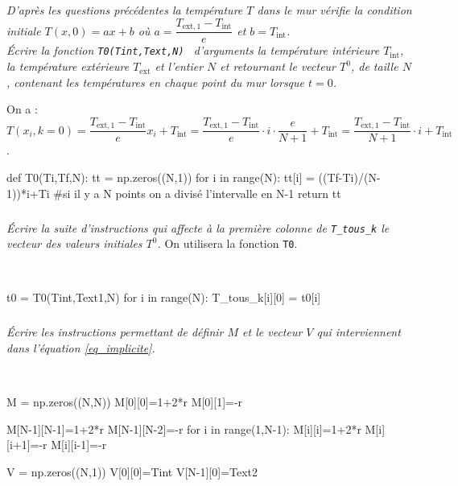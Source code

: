 \documentclass[10pt,fleqn]{article} %
\begin{document}
\subparagraph{}
\textit{D'après les questions précédentes la température $T$ dans le mur vérifie la condition
 initiale  $T(x,0)=ax+b$ où 
 $a=\dfrac{T_{\text{ext},1}-T_{\text{int}}}{e}$  et  $b=T_{\text{int}}$.\\
Écrire la fonction \texttt{T0(Tint,Text,N) } d'arguments la température intérieure $T_{\text{int}}$, 
la température extérieure $T_{\text{ext}}$ et l'entier $N$ et retournant le vecteur $T^0$, de taille $N$,
contenant les températures en chaque point du mur lorsque $t=0$. }
\ifprof
\begin{corrige} 
On a : $T(x_i,k=0)=\dfrac{T_{\text{ext},1}-T_{\text{int}}}{e}x_i + T_{\text{int}} = \dfrac{T_{\text{ext},1}-T_{\text{int}}}{e}\cdot i \cdot \dfrac{e}{N+1} + T_{\text{int}} =  \dfrac{T_{\text{ext},1}-T_{\text{int}}}{N+1}\cdot i  + T_{\text{int}}$.
~\\
\begin{python}
def T0(Ti,Tf,N):
    tt =  np.zeros((N,1))
    for i in range(N):
        tt[i] = ((Tf-Ti)/(N-1))*i+Ti #si il y a N points on a divisé l'intervalle en N-1
    return tt
\end{python}
\end{corrige}
\else
\fi



\subparagraph{}
\textit{Écrire la suite d'instructions qui affecte à la première colonne de \texttt{T\_tous\_k} 
 le vecteur des valeurs initiales $T^0$. }
 On utilisera la fonction \texttt{T0}. 
\ifprof
\begin{corrige}~\\

\begin{python}
t0 = T0(Tint,Text1,N)
for i in range(N):
    T_tous_k[i][0] = t0[i]
\end{python}
\end{corrige}
\else
\fi



\subparagraph{}
\textit{Écrire les instructions permettant de définir $M$ et le vecteur $V$ qui interviennent dans l'équation \ref{eq_implicite}. }
\ifprof
\begin{corrige} ~\\
\begin{python}
M = np.zeros((N,N))
M[0][0]=1+2*r
M[0][1]=-r

M[N-1][N-1]=1+2*r
M[N-1][N-2]=-r
for i in range(1,N-1):
    M[i][i]=1+2*r
    M[i][i+1]=-r
    M[i][i-1]=-r

V = np.zeros((N,1))
V[0][0]=Tint
V[N-1][0]=Text2
\end{python}
\end{corrige}
\end{document}
